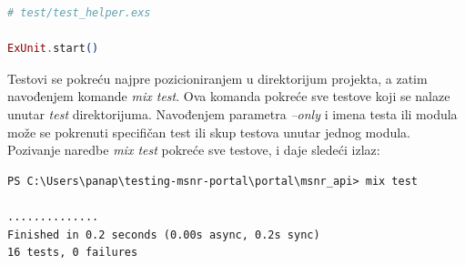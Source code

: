 \documentclass[12pt,oneside]{memoir}
\begin{document}
\begin{lstlisting}[language=elixir, caption={Pokretanje ExUnit},captionpos=b, label={lst:start}]
# test/test_helper.exs

ExUnit.start()
\end{lstlisting}

\par Testovi se pokreću najpre pozicioniranjem u direktorijum projekta, a zatim navođenjem komande \emph{mix test}. Ova komanda pokreće sve testove koji se nalaze unutar \emph{test} direktorijuma. Navođenjem parametra \emph{--only} i imena testa ili modula može se pokrenuti specifičan test ili skup testova unutar jednog modula. Pozivanje naredbe \emph{mix test} pokreće sve testove, i daje sledeći izlaz:  

\begin{lstlisting}[style=DOS]
PS C:\Users\panap\testing-msnr-portal\portal\msnr_api> mix test

..............
Finished in 0.2 seconds (0.00s async, 0.2s sync)
16 tests, 0 failures
\end{lstlisting}
\end{document}
